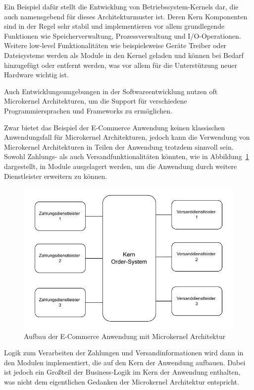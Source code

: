 \documentclass[acmtog]{acmart}
\begin{document}
Ein Beispiel dafür stellt die Entwicklung von Betriebssystem-Kernels dar, die auch namensgebend für dieses Architekturmuster ist.
Deren Kern Komponenten sind in der Regel sehr stabil und implementieren vor allem grundlegende Funktionen wie Speicherverwaltung, Prozessverwaltung und I/O-Operationen.
Weitere low-level Funktionalitäten wie beispielsweise Geräte Treiber oder Dateisysteme werden als Module in den Kernel geladen und können bei Bedarf hinzugefügt oder entfernt werden, was vor allem für die Unterstützung neuer Hardware wichtig ist.

Auch Entwicklungsumgebungen in der Softwareentwicklung nutzen oft Microkernel Architekturen, um die Support für verschiedene Programmiersprachen und Frameworks zu ermöglichen.

Zwar bietet das Beispiel der E-Commerce Anwendung keinen klassischen Anwendungsfall für Microkernel Architekturen, jedoch kann die Verwendung von Microkernel Architekturen in Teilen der Anwendung trotzdem sinnvoll sein.
Sowohl Zahlungs- als auch Versandfunktionalitäten könnten, wie in Abbildung~\ref{fig:ecommerce-microkernel} dargestellt, in Module ausgelagert werden, um die Anwendung durch weitere Dienstleister erweitern zu können.

\begin{figure}[!h]
  \centering
  \includegraphics[width=\linewidth]{images/microkernel/ecommerce-microkernel}
  \caption{Aufbau der E-Commerce Anwendung mit Microkernel Architektur}
  \label{fig:ecommerce-microkernel}
\end{figure}

Logik zum Verarbeiten der Zahlungen und Versandinformationen wird dann in den Modulen implementiert, die auf den Kern der Anwendung aufbauen.
Dabei ist jedoch ein Großteil der Business-Logik im Kern der Anwendung enthalten, was nicht dem eigentlichen Gedanken der Microkernel Architektur entspricht.
\end{document}
